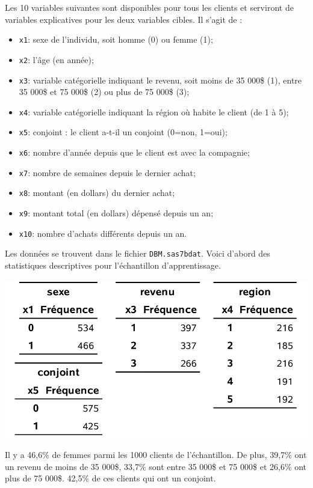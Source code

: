\documentclass[
  11pt,
  letterpaper,
]{book}
\providecommand{\tightlist}{%
  \setlength{\itemsep}{0pt}\setlength{\parskip}{0pt}}
\theoremstyle{definition}
\theoremstyle{definition}
\theoremstyle{definition}
\theoremstyle{definition}
\theoremstyle{remark}
\begin{document}
Les 10 variables suivantes sont disponibles pour tous les clients et serviront de variables explicatives pour les deux variables cibles. Il s'agit de :

\begin{itemize}
\tightlist
\item
  \texttt{x1}: sexe de l'individu, soit homme (0) ou femme (1);
\item
  \texttt{x2}: l'âge (en année);
\item
  \texttt{x3}: variable catégorielle indiquant le revenu, soit moins de 35 000\$ (1), entre 35 000\$ et 75 000\$ (2) ou plus de 75 000\$ (3);
\item
  \texttt{x4}: variable catégorielle indiquant la région où habite le client (de 1 à 5);
\item
  \texttt{x5}: conjoint : le client a-t-il un conjoint (0=non, 1=oui);
\item
  \texttt{x6}: nombre d'année depuis que le client est avec la compagnie;
\item
  \texttt{x7}: nombre de semaines depuis le dernier achat;
\item
  \texttt{x8}: montant (en dollars) du dernier achat;
\item
  \texttt{x9}: montant total (en dollars) dépensé depuis un an;
\item
  \texttt{x10}: nombre d'achats différents depuis un an.
\end{itemize}

Les données se trouvent dans le fichier \texttt{DBM.sas7bdat}. Voici d'abord des statistiques descriptives pour l'échantillon d'apprentissage.

\begin{center}\includegraphics[width=0.6\linewidth]{figures/02-select-e3} \end{center}

Il y a 46,6\% de femmes parmi les 1000 clients de l'échantillon. De plus, 39,7\% ont un revenu de moins de 35 000\$, 33,7\% sont entre 35 000\$ et 75 000\$ et 26,6\% ont plus de 75 000\$. 42,5\% de ces clients qui ont un conjoint.
\end{document}
